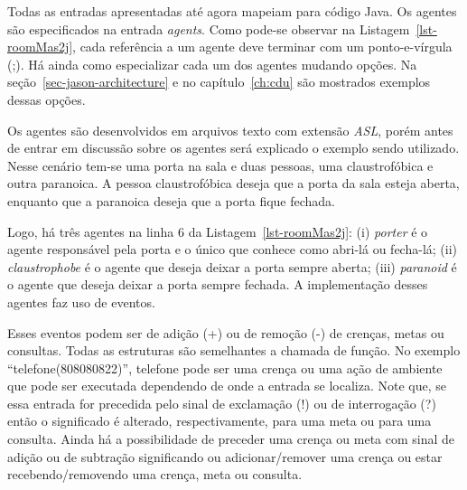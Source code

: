 Todas as entradas apresentadas até agora mapeiam para código Java.
Os agentes são especificados na entrada \emph{agents}. Como pode-se
observar na Listagem~\ref{lst-roomMas2j}, cada referência a um agente deve
terminar com um ponto-e-vírgula (;). Há ainda como especializar cada um dos
agentes mudando opções. Na seção~\ref{sec-jason-architecture} e no
capítulo~\ref{ch:cdu} são mostrados exemplos dessas opções.

Os agentes são desenvolvidos em arquivos texto com extensão \emph{ASL}, porém
antes de entrar em discussão sobre os agentes será explicado o exemplo sendo
utilizado. Nesse cenário tem-se uma porta na sala e duas pessoas, uma
claustrofóbica e outra paranoica. A pessoa claustrofóbica deseja que a
porta da sala esteja aberta, enquanto que a paranoica deseja que a porta
fique fechada.

Logo, há três agentes na linha 6 da Listagem~\ref{lst-roomMas2j}:
(i) \emph{porter} é o agente responsável pela porta e o único que conhece
como abri-lá ou fecha-lá;
(ii) \emph{claustrophobe} é o agente que deseja deixar a porta sempre aberta;
(iii) \emph{paranoid} é o agente que deseja deixar a porta sempre fechada.
A implementação desses agentes faz uso de eventos.

Esses eventos podem ser de adição (+) ou de remoção (-) de crenças, metas ou
consultas. Todas as estruturas são semelhantes a chamada de função. No
exemplo ``telefone(808080822)'', telefone pode ser uma crença ou uma ação de
ambiente que pode ser executada dependendo de onde a entrada se localiza.
Note que, se essa entrada for precedida pelo sinal de exclamação (!) ou de
interrogação (?) então o significado é alterado, respectivamente, para uma meta
ou para uma consulta. Ainda há a possibilidade de preceder uma crença ou meta
com sinal de adição ou de subtração significando ou adicionar/remover uma
crença ou estar recebendo/removendo uma crença, meta ou consulta.

